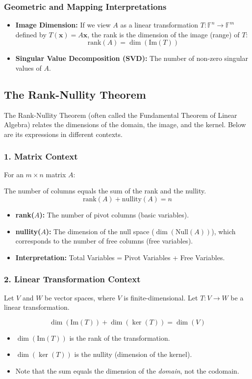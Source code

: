 \documentclass[oneside]{book}
\begin{document}
\subsubsection{Geometric and Mapping Interpretations}
\begin{itemize}
    \item \textbf{Image Dimension:} If we view $A$ as a linear transformation $T: \mathbb{F}^n \to \mathbb{F}^m$ defined by $T(\mathbf{x}) = A\mathbf{x}$, the rank is the dimension of the image (range) of $T$:
    \[ \text{rank}(A) = \dim(\text{Im}(T)) \]
    \item \textbf{Singular Value Decomposition (SVD):} The number of non-zero singular values of $A$.
\end{itemize}

\subsection{The Rank-Nullity Theorem}

The Rank-Nullity Theorem (often called the Fundamental Theorem of Linear Algebra) relates the dimensions of the domain, the image, and the kernel. Below are its expressions in different contexts.

\subsubsection{1. Matrix Context}
For an $m \times n$ matrix $A$:
\begin{theorem}
The number of columns equals the sum of the rank and the nullity.
\[ \text{rank}(A) + \text{nullity}(A) = n \]
\end{theorem}
\begin{itemize}
    \item \textbf{rank($A$):} The number of pivot columns (basic variables).
    \item \textbf{nullity($A$):} The dimension of the null space ($\dim(\text{Null}(A))$), which corresponds to the number of free columns (free variables).
    \item \textbf{Interpretation:} Total Variables = Pivot Variables + Free Variables.
\end{itemize}

\subsubsection{2. Linear Transformation Context}
Let $V$ and $W$ be vector spaces, where $V$ is finite-dimensional. Let $T: V \to W$ be a linear transformation.
\begin{theorem}
\[ \dim(\text{Im}(T)) + \dim(\ker(T)) = \dim(V) \]
\end{theorem}
\begin{itemize}
    \item $\dim(\text{Im}(T))$ is the rank of the transformation.
    \item $\dim(\ker(T))$ is the nullity (dimension of the kernel).
    \item Note that the sum equals the dimension of the \textit{domain}, not the codomain.
\end{itemize}
\end{document}
